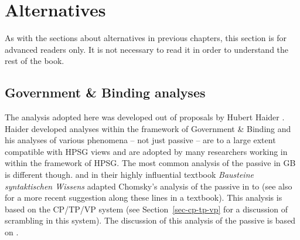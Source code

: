 



\section{Alternatives}

As with the sections about alternatives in previous chapters, this section is for advanced readers
only. It is not necessary to read it in order to understand the rest of the book.


\subsection{Government \& Binding analyses}
\label{sec-passive-GB}

The analysis adopted here was developed out of proposals by Hubert Haider
\citeyearpar{Haider86}. Haider developed analyses within the framework of Government \& Binding
\citep{Chomsky81a} and his analyses of various phenomena -- not just passive -- are to a large extent compatible with HPSG views and are adopted
by many researchers working in  within the framework of HPSG. The most common analysis of the
passive in GB is different though.  \cites[155--157]{Grewendorf88a}[]{Grewendorf93} and
\citet[462--463]{SS88a} in their highly influential textbook \emph{Bausteine syntaktischen Wissens} adapted Chomsky's analysis of the passive in
 \citep[]{Chomsky81a} to  (see also \citealt[]{Lohnstein2014a} for a
more recent suggestion along these lines in a textbook). This analysis is based on the CP/TP/VP system (see Section~\ref{sec-cp-tp-vp} for a discussion of
scrambling in this system). The discussion of this analysis of the passive is based on .

